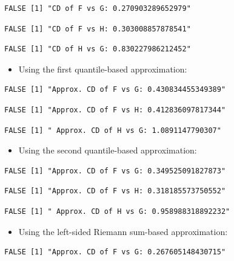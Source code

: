 \documentclass[
]{article}
\providecommand{\tightlist}{%
  \setlength{\itemsep}{0pt}\setlength{\parskip}{0pt}}
\begin{document}
\begin{verbatim}
FALSE [1] "CD of F vs G: 0.270903289652979"
\end{verbatim}

\begin{verbatim}
FALSE [1] "CD of F vs H: 0.303008857878541"
\end{verbatim}

\begin{verbatim}
FALSE [1] "CD of H vs G: 0.830227986212452"
\end{verbatim}

\begin{itemize}
\tightlist
\item
  Using the first quantile-based approximation:
\end{itemize}

\begin{verbatim}
FALSE [1] "Approx. CD of F vs G: 0.430834455349389"
\end{verbatim}

\begin{verbatim}
FALSE [1] "Approx. CD of F vs H: 0.412836097817344"
\end{verbatim}

\begin{verbatim}
FALSE [1] " Approx. CD of H vs G: 1.0891147790307"
\end{verbatim}

\begin{itemize}
\tightlist
\item
  Using the second quantile-based approximation:
\end{itemize}

\begin{verbatim}
FALSE [1] "Approx. CD of F vs G: 0.349525091827873"
\end{verbatim}

\begin{verbatim}
FALSE [1] "Approx. CD of F vs H: 0.318185573750552"
\end{verbatim}

\begin{verbatim}
FALSE [1] " Approx. CD of H vs G: 0.958988318892232"
\end{verbatim}

\begin{itemize}
\tightlist
\item
  Using the left-sided Riemann sum-based approximation:
\end{itemize}

\begin{verbatim}
FALSE [1] "Approx. CD of F vs G: 0.267605148430715"
\end{verbatim}
\end{document}
